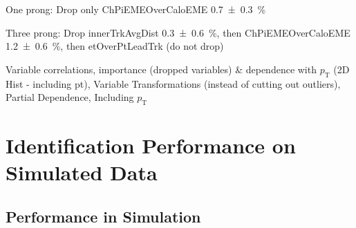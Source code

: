 One prong: Drop only ChPiEMEOverCaloEME \SI{0.7 +- 0.3}{\percent}

Three prong: Drop innerTrkAvgDist \SI{0.3 +- 0.6}{\percent}, then
ChPiEMEOverCaloEME \SI{1.2 +- 0.6}{\percent}, then etOverPtLeadTrk (do not drop)

Variable correlations, importance (dropped variables) \& dependence with
$p_\mathrm{T}$ (2D Hist - including pt), Variable Transformations (instead
of cutting out outliers), Partial Dependence, Including $p_\mathrm{T}$

\section{Identification Performance on Simulated Data}
\label{sec:bdt_perf}

\subsection{Performance in Simulation}
\label{sec:bdt_perf_sim}

